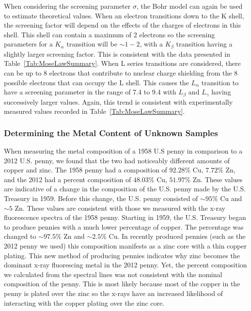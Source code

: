 \documentclass[%
 reprint,
 amsmath,amssymb,
 aps,
 pra,
]{revtex4-1}
\begin{document}
When considering the screening parameter $\sigma$, the Bohr model can again be used to estimate theoretical values. When an electron transitions down to the K shell, the screening factor will depend on the effects of the charges of electrons in this shell. This shell can contain a maximum of 2 electrons so the screening parameters for a $K_{\alpha}$ transition will be $\sim 1-2$, with a $K_{\beta}$ transition having a slightly larger screening factor. This is consistent with the data presented in Table~\ref{Tab:MoseLawSummary}. When L series transitions are considered, there can be up to 8 electrons that contribute to nuclear charge shielding from the 8 possible electrons that can occupy the L shell. This causes the $L_{\alpha}$ transition to have a screening parameter in the range of 7.4 to 9.4 with $L_{\beta}$ and $L_{\gamma}$ having successively larger values. Again, this trend is consistent with experimentally measured values recorded in Table~\ref{Tab:MoseLawSummary}.

\subsubsection{Determining the Metal Content of Unknown Samples}

When measuring the metal composition of a 1958 U.S penny in comparison to a 2012 U.S. penny, we found that the two had noticeably different amounts of copper and zinc. The 1958 penny had a composition of $92.28 \%$ Cu, $7.72 \%$ Zn, and the 2012 had a percent composition of $48.03 \%$ Cu, $51.97 \%$ Zn. These values are indicative of a change in the composition of the U.S. penny made by the U.S. Treasury in 1959. Before this change, the U.S. penny consisted of $\sim 95 \%$ Cu and $\sim 5$ Zn. These values are consistent with those we measured with the x-ray fluorescence spectra of the 1958 penny. Starting in 1959, the U.S. Treasury began to produce pennies with a much lower percentage of copper. The percentage was changed to $\sim 97.5 \%$ Zn
and $\sim 2.5 \%$ Cu. In recently produced pennies (such as the 2012 penny we used) this composition manifests as a zinc core with a thin copper plating. This new method of producing pennies indicates why zinc becomes the dominant x-ray fluorescing metal in the 2012 penny. Yet, the percent composition we calculated from the spectral lines was not consistent with the nominal composition of the penny. This is most likely because most of the copper in the penny is plated over the zinc so the x-rays have an increased likelihood of interacting with the copper plating over the zinc core. \cite{UStreasury}
\end{document}
